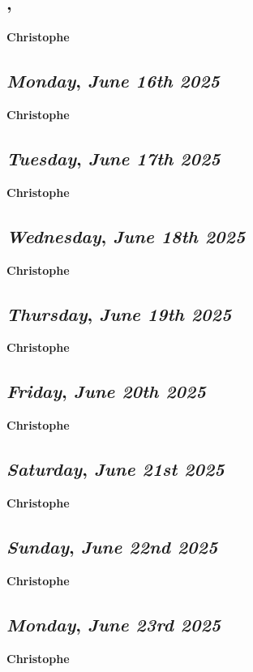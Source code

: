 \subsection*{\weekday, \day}
\textbf {Christophe}

\def\day{\textit{June 16th 2025}}
\def\weekday{\textit{Monday}}
\subsection*{\weekday, \day}
\textbf {Christophe}

\def\day{\textit{June 17th 2025}}
\def\weekday{\textit{Tuesday}}
\subsection*{\weekday, \day}
\textbf {Christophe}

\def\day{\textit{June 18th 2025}}
\def\weekday{\textit{Wednesday}}
\subsection*{\weekday, \day}
\textbf {Christophe}

\def\day{\textit{June 19th 2025}}
\def\weekday{\textit{Thursday}}
\subsection*{\weekday, \day}
\textbf {Christophe}

\def\day{\textit{June 20th 2025}}
\def\weekday{\textit{Friday}}
\subsection*{\weekday, \day}
\textbf {Christophe}

\def\day{\textit{June 21st 2025}}
\def\weekday{\textit{Saturday}}
\subsection*{\weekday, \day}
\textbf {Christophe}

\def\day{\textit{June 22nd 2025}}
\def\weekday{\textit{Sunday}}
\subsection*{\weekday, \day}
\textbf {Christophe}

\def\day{\textit{June 23rd 2025}}
\def\weekday{\textit{Monday}}
\subsection*{\weekday, \day}
\textbf {Christophe}

